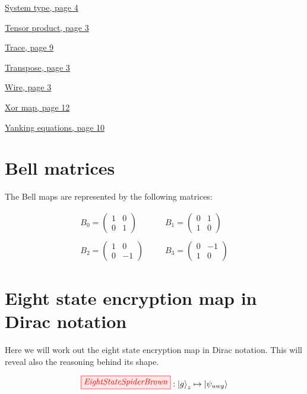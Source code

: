 \documentclass[]{article}
\begin{document}
\hyperref[identity]{System type, page 4}

\hyperref[section:tensorproduct]{Tensor product, page 3}

\hyperref[discarding]{Trace, page 9}

\hyperref[braandket]{Transpose, page 3}

\hyperref[identity]{Wire, page 3}

\hyperref[xorgate]{Xor map, page 12}

\hyperref[section:yankingequations]{Yanking equations, page 10}

\section{Bell matrices}
\label{appendix:BellMaps}


The Bell maps are represented by the following matrices:

\begin{equation}
\begin{aligned}
B_0 = 
\begin{pmatrix}
1 & 0 \\
0 & 1
\end{pmatrix}  %
~~~~&~~~~ B_1 = 
\begin{pmatrix}
0 & 1 \\
1 & 0
\end{pmatrix}%
\\\\
B_2 = 
\begin{pmatrix}
1 & 0 \\
0 & -1
\end{pmatrix}  %
~~~~&~~~~  B_3 = 
\begin{pmatrix}
0 & -1 \\
1 & 0
\end{pmatrix}
\end{aligned}
\end{equation}

\section{Eight state encryption map in Dirac notation}
\label{appendix:EightStateEncryptionMapDirac}
Here we will work out the eight state encryption map in Dirac notation. This will reveal also the reasoning behind its shape. 

\begin{equation}
\tikzfig{EightStateSpiderBrown} :
\ket{g}_z \mapsto \ket{\psi_{uwg}}
\end{equation}
\end{document}
